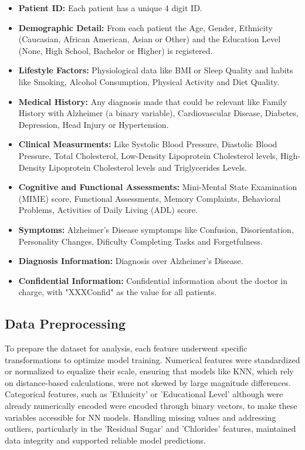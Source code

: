 \documentclass[conference]{IEEEtran}
\begin{document}
    \begin{itemize}
    \item \textbf{Patient ID:} Each patient has a unique 4 digit ID.
    \item \textbf{Demographic Detail:} From each patient the Age, Gender, Ethnicity (Caucasian, African American, Asian or Other) and the Education Level (None, High School, Bachelor or Higher) is registered.
    \item \textbf{Lifestyle Factors:} Physiological data like BMI or Sleep Quality and habits like Smoking, Alcohol Consumption, Physical Activity and Diet Quality.
    \item \textbf{Medical History:} Any diagnosis made that could be relevant like Family  History with Alzheimer (a binary variable), Cardiovascular Disease, Diabetes, Depression, Head Injury or Hypertension.
    \item \textbf{Clinical Measurments:} Like Systolic Blood Pressure, Diastolic Blood Pressure, Total Cholesterol, Low-Density Lipoprotein Cholesterol levels, High-Density Lipoprotein Cholesterol levels and Triglycerides Levels.
    \item \textbf{Cognitive and Functional Assessments:} Mini-Mental State Examination (MIME) score, Functional Assessments, Memory Complaints, Behavioral Problems, Activities of Daily Living (ADL) score.
    \item \textbf{Symptoms:} Alzheimer's Disease symptomps like Confusion, Disorientation, Personality Changes, Dificulty Completing Tasks and Forgetfulness.
    \item \textbf{Diagnosis Information:} Diagnosis over Alzheimer's Disease.
    \item \textbf{Confidential Information:} Confidential information about the doctor in charge, with "XXXConfid" as the value for all patients.
    \end{itemize}
    
\subsection{Data Preprocessing}

To prepare the dataset for analysis, each feature underwent specific transformations to optimize model training. Numerical features were standardized or normalized to equalize their scale, ensuring that models like KNN, which rely on distance-based calculations, were not skewed by large magnitude differences. Categorical features, such as 'Ethnicity' or 'Educational Level' although were already numerically encoded were encoded through binary vectors, to make these variables accessible for NN models. Handling missing values and addressing outliers, particularly in the 'Residual Sugar' and 'Chlorides' features, maintained data integrity and supported reliable model predictions.
\end{document}

